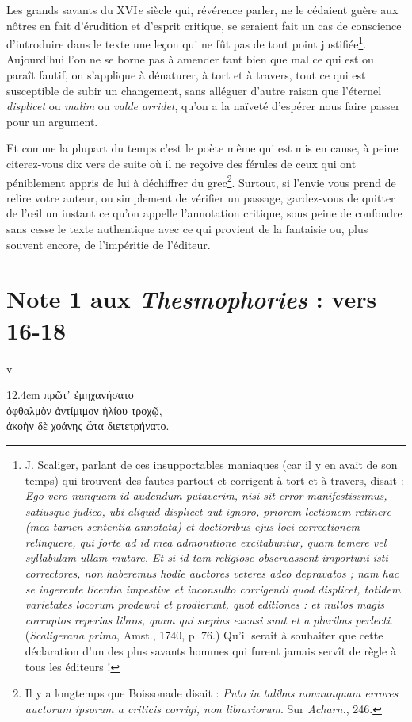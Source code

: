 \documentclass{book}%
\newcommand{\italique}[1]{\textit{#1}}%
\newcommand{\espace}[1]{\hspace{#1}}%
\newcommand{\nieme}[1]{#1\italique{e}}%
\newlength{\larg}%
\newcommand{\decalage}[1]{%
\settowidth{\larg}{#1}%
\espace{\larg}%
}
\newcommand{\fantome}{{\color{white}v}}
\newcommand{\Note}[1]{\section*{#1}%
\addcontentsline{toc}{section}{#1}}
\newcommand{\note}[1]{\footnote{#1}}
\newcommand{\citComm}[1]{\fantome\\
\espace{1cm}\begin{minipagewithmarginpars}{12.4cm}%
#1
\end{minipagewithmarginpars}%
}
\begin{document}
Les grands savants du \nieme{XVI} siècle qui, révérence parler, ne le cédaient guère aux nôtres en fait d'érudition et d'esprit critique, se seraient fait un cas de conscience d'introduire dans le texte une leçon qui ne fût pas de tout point justifiée\note{J. Scaliger, parlant de ces insupportables maniaques (car il y en avait de son temps) qui trouvent des fautes partout et corrigent à tort et à travers, disait : \italique{Ego vero nunquam id audendum putaverim, nisi sit error manifestissimus, satiusque judico, ubi aliquid displicet aut ignoro, priorem lectionem retinere (mea tamen sententia annotata) et doctioribus ejus loci correctionem relinquere, qui forte ad id mea admonitione excitabuntur, quam temere vel syllabulam ullam mutare. Et si id tam religiose observassent importuni isti correctores, non haberemus hodie auctores veteres adeo depravatos ; nam hac se ingerente licentia impestive et inconsulto corrigendi quod displicet, totidem varietates locorum prodeunt et prodierunt, quot editiones : et nullos magis corruptos reperias libros, quam qui sœpius excusi sunt et a pluribus perlecti}. (\italique{Scaligerana prima}, Amst., 1740, p. 76.) Qu'il serait à souhaiter que cette déclaration d'un des plus savants hommes qui furent jamais servît de règle à tous les éditeurs !}. Aujourd'hui l'on ne se borne pas à amender tant bien que mal ce qui est ou paraît fautif, on s'applique à dénaturer, à tort et à travers, tout ce qui est susceptible de subir un changement, sans alléguer d'autre raison que l'éternel \italique{displicet} ou \italique{malim} ou \italique{valde arridet}, qu'on a la naïveté d'espérer nous faire passer pour un argument. 

Et comme la plupart du temps c'est le poète même qui est mis en cause, à peine citerez-vous dix vers de suite où il ne reçoive des férules de ceux qui ont péniblement appris de lui à déchiffrer du grec\note{Il y a longtemps que Boissonade disait : \italique{Puto in talibus nonnunquam errores auctorum ipsorum a criticis corrigi, non librariorum}. Sur \italique{Acharn.}, 246.}. Surtout, si l'envie vous prend de relire votre auteur, ou simplement de vérifier un passage, gardez-vous de quitter de l'œil un instant ce qu'on appelle l'annotation critique, sous peine de confondre sans cesse le texte authentique avec ce qui provient de la fantaisie ou, plus souvent encore, de l'impéritie de l'éditeur.

\Note{Note 1 aux \italique{Thesmophories} : vers 16-18}

\citComm{\decalage{ὀφθαλμὸν ἀντί}πρῶτ᾽ ἐμηχανήσατο\\
ὀφθαλμὸν ἀντίμιμον ἡλίου τροχῷ,\\
ἀκοὴν δὲ χοάνης ὦτα διετετρήνατο.\\}
\end{document}
